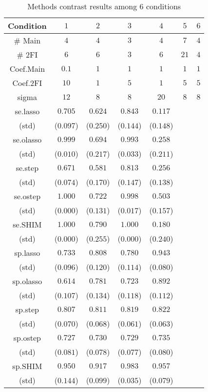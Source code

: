 \documentclass[12pt]{article}\usepackage[]{graphicx}\usepackage[]{color}
\begin{document}

\begin{table}[!htb]
\caption{Methods contrast results among $6$ conditions}\label{tab:result}
\begin{center}
\begin{tabular}{|c|c|c|c|c|c|c|}
\hline
Condition & $1$ & $2$ & $3$ & $4$ & $5$ & $6$ \\
\hline
\# Main 	&	$4$	&	$4$	& $3$	& $4$ & $7$ & $4$ \\
\hline 
\# 2FI 	&	$6$	&	$6$	&	$3$ & $6$ & $21$ & $4$\footnotemark[3] \\
\hline
Coef.Main &	$0.1$	&	$1$	& $1$	& $1$ & $1$ & $1$ \\
\hline
Coef.2FI 	&	$10$ &	$1$ & $5$ & $1$ & $5$ & $5$ \\
\hline
sigma 	& $12$	& $8$	& $8$ & $20$ & $8$ & $8$ \\
\hline
se.lasso  & $0.705$	&	$0.624$ & $0.843$  & $0.117$ & & \\
(std) &	($0.097$) &	($0.250$) & ($0.144$) & ($0.148$) & & \\
\hline
se.olasso 	& $0.999$	& $0.694$	& $0.993$ & $0.258$ & & \\
(std) & ($0.010$)	&	($0.217$) & ($0.033$) & ($0.211$) & & \\
\hline
se.step 	&	$0.671$ & $0.581$	&	$0.813$ & $0.256$ & & \\
(std) &	($0.074$) &	($0.170$)	&	($0.147$) & ($0.138$) & & \\
\hline
se.ostep 	&	$1.000$ &	$0.722$	&	$0.998$ & $0.503$ & & \\
(std) &	($0.000$) &	($0.131$)	&	($0.017$) & ($0.157$) & & \\
\hline
se.SHIM \footnotemark[2] 	& $1.000$	& $0.790$	& $1.000$ & $0.180$ & &  \\
(std) & ($0.000$)	& ($0.255$)	& ($0.000$) & ($0.240$) & &  \\
\hline
sp.lasso  & $0.733$	&	$0.808$	&	$0.780$ & $0.943$ & & \\
(std) &	($0.096$) &	($0.120$)	& ($0.114$) & ($0.080$) & & \\
\hline
sp.olasso 	& $0.614$	&	$0.781$	&	$0.723$ & $0.892$ & & \\
(std) &	($0.107$) & ($0.134$)	& ($0.118$) & ($0.112$) & & \\
\hline
sp.step 	& $0.807$	&	$0.811$	&	$0.819$ & $0.822$ & & \\
(std) &	($0.070$)&	($0.068$)	&	($0.061$) & ($0.063$) & & \\
\hline
sp.ostep 	& $0.727$	&	$0.730$	& $0.729$	& $0.735$ & & \\
(std) & ($0.081$)	&	($0.078$)	& ($0.077$)	& ($0.080$) & & \\
\hline
sp.SHIM \footnotemark[2] 	&	$0.950$ & $0.917$	& $0.983$ & $0.957$ & &  \\
(std) &	($0.144$) & ($0.099$)	& ($0.035$) & ($0.079$) & &  \\
\hline
\end{tabular}
\end{center}
\end{table}


\end{document}
